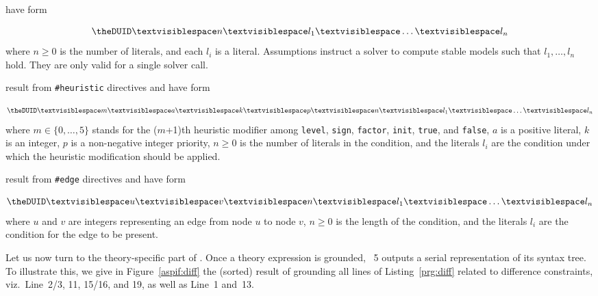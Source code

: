  have form
\addtocounter{DUID}{1}
\[\texttt{\theDUID} \Space n \Space l_1 \Space \dots \Space l_n\]
where
$n\geq 0$ is the number of literals, and
each $l_i$ is a literal.
Assumptions instruct a solver to compute      stable models such that $l_1,\dots,l_n$ hold.
They are only valid for a single solver call.

 result from \lstinline{#heuristic} directives and have form
\addtocounter{DUID}{1}
\[\texttt{\theDUID} \Space m \Space a \Space k \Space p  \Space n  \Space l_1 \Space \dots \Space l_n\]
where
$m\in\{0,\dots,5\}$ stands for the ($m$+1)th heuristic modifier among %
\lstinline{level}, \lstinline{sign}, \lstinline{factor}, \lstinline{init}, \lstinline{true}, and \lstinline{false}, %
$a$ is a positive literal,
$k$ is %
an integer,
$p$ is a non-negative integer priority,
$n \geq 0$ is the number of literals in the condition, and
the literals $l_i$ are the condition under which the heuristic modification should be applied.

 result from \lstinline{#edge} directives and have form
\addtocounter{DUID}{1}
\[\texttt{\theDUID} \Space u \Space v \Space n  \Space l_1 \Space \dots \Space l_n\]
where
$u$ and $v$ are integers representing an edge from node $u$ to node $v$,
$n \geq 0$ is the length of the condition, and
the literals $l_i$ are the condition for the edge to be present.

Let us now turn to the theory-specific part of \aspif.
Once a theory expression is grounded,
\gringo~5 %
outputs a serial representation of its syntax tree.
To illustrate this,
we give in Figure~\ref{aspif:diff} the (sorted) result of grounding all lines of Listing~\ref{prg:diff} related to difference constraints,
viz.\ Line~2/3, 11, 15/16, and 19, as well as Line~1 and~13.

